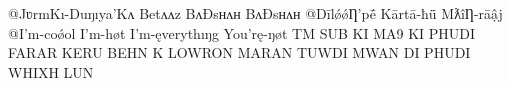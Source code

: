 @JʋrmKı-Duŋıya'Kʌ Betʌʌz BʌÐsʜʌʜ BʌÐsʜʌʜ 
@DīlǿǿȠ'pḗ Kārtā-ħǖ MƛîȠ-rāậj 
@I'm-coǿol I'm-høt I'm-ęverythıŋg You'rę-ŋøt 
TM SUB KI MA9 KI PHUDI FARAR KERU BEHN K LOWRON MARAN TUWDI MWAN DI PHUDI WHIXH LUN
